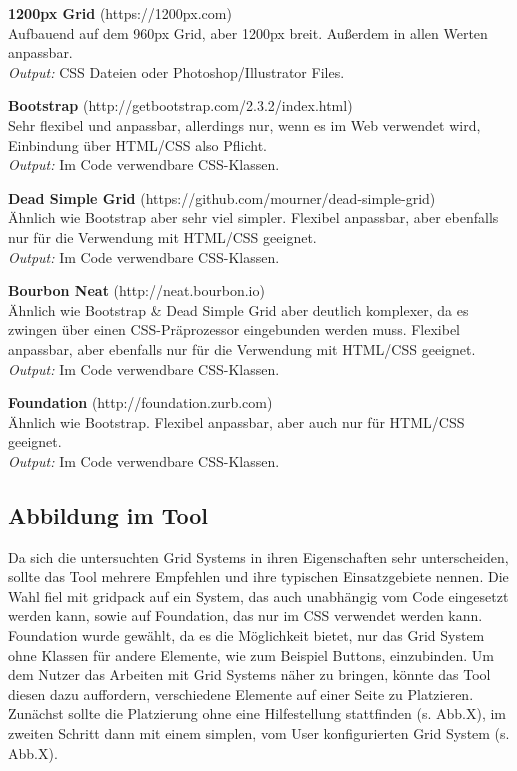 \textbf{1200px Grid} (https://1200px.com) \\
Aufbauend auf dem 960px Grid, aber 1200px breit. Außerdem in allen Werten anpassbar. \\
\textit{Output:} CSS Dateien oder Photoshop/Illustrator Files.

\textbf{Bootstrap} (http://getbootstrap.com/2.3.2/index.html) \\
Sehr flexibel und anpassbar, allerdings nur, wenn es im Web verwendet wird, Einbindung über HTML/CSS also Pflicht. \\
\textit{Output:} Im Code verwendbare CSS-Klassen.

\textbf{Dead Simple Grid} (https://github.com/mourner/dead-simple-grid) \\
Ähnlich wie Bootstrap aber sehr viel simpler. Flexibel anpassbar, aber ebenfalls nur für die Verwendung mit HTML/CSS geeignet. \\
\textit{Output:} Im Code verwendbare CSS-Klassen.

\textbf{Bourbon Neat} (http://neat.bourbon.io) \\
Ähnlich wie Bootstrap \& Dead Simple Grid aber deutlich komplexer, da es zwingen über einen CSS-Präprozessor eingebunden werden muss. Flexibel anpassbar, aber ebenfalls nur für die Verwendung mit HTML/CSS geeignet. \\
\textit{Output:} Im Code verwendbare CSS-Klassen.

\textbf{Foundation} (http://foundation.zurb.com) \\
Ähnlich wie Bootstrap. Flexibel anpassbar, aber auch nur für HTML/CSS geeignet. \\
\textit{Output:} Im Code verwendbare CSS-Klassen.

\subsection{Abbildung im Tool}
Da sich die untersuchten Grid Systems in ihren Eigenschaften sehr unterscheiden, sollte das Tool mehrere Empfehlen und ihre typischen Einsatzgebiete nennen.
Die Wahl fiel mit gridpack auf ein System, das auch unabhängig vom Code eingesetzt werden kann, sowie auf Foundation, das nur im CSS verwendet werden kann. Foundation wurde gewählt, da es die Möglichkeit bietet, nur das Grid System ohne Klassen für andere Elemente, wie zum Beispiel Buttons, einzubinden.
Um dem Nutzer das Arbeiten mit Grid Systems näher zu bringen, könnte das Tool diesen dazu auffordern, verschiedene Elemente auf einer Seite zu Platzieren. Zunächst sollte die Platzierung ohne eine Hilfestellung stattfinden (s. Abb.X), im zweiten Schritt dann mit einem simplen, vom User konfigurierten Grid System (s. Abb.X).

